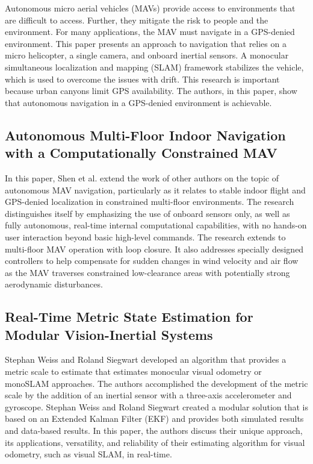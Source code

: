 Autonomous micro aerial vehicles (MAVs) provide access to environments that are difficult to access. Further, they mitigate the risk to people and the environment. For many applications, the MAV must navigate in a GPS-denied environment. This paper presents an approach to navigation that relies on a micro helicopter, a single camera, and onboard inertial sensors. A monocular simultaneous localization and mapping (SLAM) framework stabilizes the vehicle, which is used to overcome the issues with drift. This research is important because urban canyons limit GPS availability. The authors, in this paper, show that autonomous navigation in a GPS-denied environment is achievable.

\subsection{Autonomous Multi-Floor Indoor Navigation with a Computationally Constrained MAV}

In this paper, Shen et al. extend the work of other authors on the topic of autonomous MAV navigation, particularly as it relates to stable indoor flight and GPS-denied localization in constrained multi-floor environments. The research distinguishes itself by emphasizing the use of onboard sensors only, as well as fully autonomous, real-time internal computational capabilities, with no hands-on user interaction beyond basic high-level commands. The research extends to multi-floor MAV operation with loop closure. It also addresses specially designed controllers to help compensate for sudden changes in wind velocity and air flow as the MAV traverses constrained low-clearance areas with potentially strong aerodynamic disturbances.

\subsection{Real-Time Metric State Estimation for Modular Vision-Inertial Systems}

Stephan Weiss and Roland Siegwart developed an algorithm that provides a metric scale to estimate that estimates monocular visual odometry or monoSLAM approaches. The authors accomplished the development of the metric scale by the addition of an inertial sensor with a three-axis accelerometer and gyroscope. Stephan Weiss and Roland Siegwart created a modular solution that is based on an Extended Kalman Filter (EKF) and provides both simulated results and data-based results. In this paper, the authors discuss their unique approach, its applications, versatility, and reliability of their estimating algorithm for visual odometry, such as visual SLAM, in real-time.

